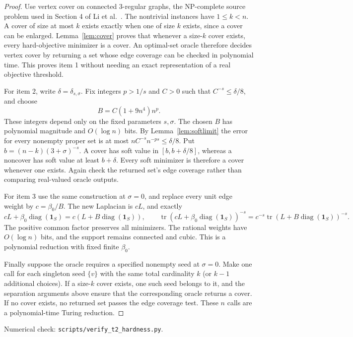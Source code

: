 \documentclass[11pt]{article}
\DeclareMathOperator{\tr}{tr}
\DeclareMathOperator{\diag}{diag}
\newcommand{\ind}{\mathbf 1}
\begin{document}
\begin{proof}
Use vertex cover on connected $3$-regular graphs, the NP-complete
source problem used in Section 4 of Li et al.~\cite{li2019}.
The nontrivial instances have $1\leq k<n$. A cover of size at most
$k$ exists exactly when one of size $k$ exists, since a cover can
be enlarged. Lemma~\ref{lem:cover} proves that whenever a size-$k$
cover exists, every hard-objective minimizer is a cover. An optimal-set
oracle therefore decides vertex cover by returning a set whose edge
coverage can be checked in polynomial time. This proves item 1
without needing an exact representation of a real objective threshold.

For item 2, write $\delta=\delta_{s,\sigma}$. Fix integers
$p>1/s$ and $C>0$ such that $C^{-s}\leq\delta/8$, and choose
\[
 B=C(1+9n^4)n^p.
\]
These integers depend only on the fixed parameters $s,\sigma$.
The chosen $B$ has polynomial magnitude and $O(\log n)$ bits.
By Lemma~\ref{lem:softlimit} the error for every nonempty proper
set is at most
$nC^{-s}n^{-ps}\leq\delta/8$. Put $b=(n-k)(3+\sigma)^{-s}$.
A cover has soft value in $[b,b+\delta/8]$, whereas a noncover
has soft value at least $b+\delta$. Every soft minimizer is therefore
a cover whenever one exists. Again check the returned set's edge
coverage rather than comparing real-valued oracle outputs.

For item 3 use the same construction at $\sigma=0$, and replace
every unit edge weight by $c=\beta_0/B$. The new Laplacian is $cL$,
and exactly
\[
 cL+\beta_0\diag(\ind_S)=c(L+B\diag(\ind_S)),\qquad
 \tr(cL+\beta_0\diag(\ind_S))^{-s}
 =c^{-s}\tr(L+B\diag(\ind_S))^{-s}.
\]
The positive common factor preserves all minimizers. The rational
weights have $O(\log n)$ bits, and the support remains connected and
cubic. This is a polynomial reduction with fixed finite $\beta_0$.

Finally suppose the oracle requires a specified nonempty seed at
$\sigma=0$. Make one call for each singleton seed $\{v\}$ with the
same total cardinality $k$ (or $k-1$ additional choices).
If a size-$k$ cover exists, one such seed belongs to it, and the
separation arguments above ensure that the corresponding oracle
returns a cover. If no cover exists, no returned set passes the edge
coverage test. These $n$ calls are a polynomial-time Turing reduction.
\end{proof}
\noindent Numerical check: \texttt{scripts/verify\_t2\_hardness.py}.
\end{document}
